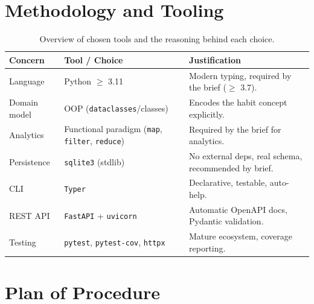\documentclass[11pt,a4paper]{article}
\begin{document}
\section{Methodology and Tooling}

\noindent


\begin{table}[H]
  \centering
  \small
  \begin{tabularx}{\textwidth}{@{}l l X@{}}
    \toprule
    \textbf{Concern} & \textbf{Tool / Choice} & \textbf{Justification} \\
    \midrule
    Language        & Python $\geq$ 3.11   & Modern typing, required by the brief ($\geq$ 3.7). \\
    Domain model    & OOP (\texttt{dataclasses}/classes) & Encodes the habit concept explicitly. \\
    Analytics       & Functional paradigm (\texttt{map}, \texttt{filter}, \texttt{reduce}) & Required by the brief for analytics. \\
    Persistence     & \texttt{sqlite3} (stdlib) & No external deps, real schema, recommended by brief. \\
    CLI             & \texttt{Typer}       & Declarative, testable, auto-help. \\
    REST API        & \texttt{FastAPI} + \texttt{uvicorn} & Automatic OpenAPI docs, Pydantic validation. \\
    Testing         & \texttt{pytest}, \texttt{pytest-cov}, \texttt{httpx} & Mature ecosystem, coverage reporting. \\
    \bottomrule
  \end{tabularx}
  \caption{Overview of chosen tools and the reasoning behind each choice.}
  \label{tab:tools}
\end{table}

\medskip
\noindent


\section{Plan of Procedure}

\noindent
\end{document}
